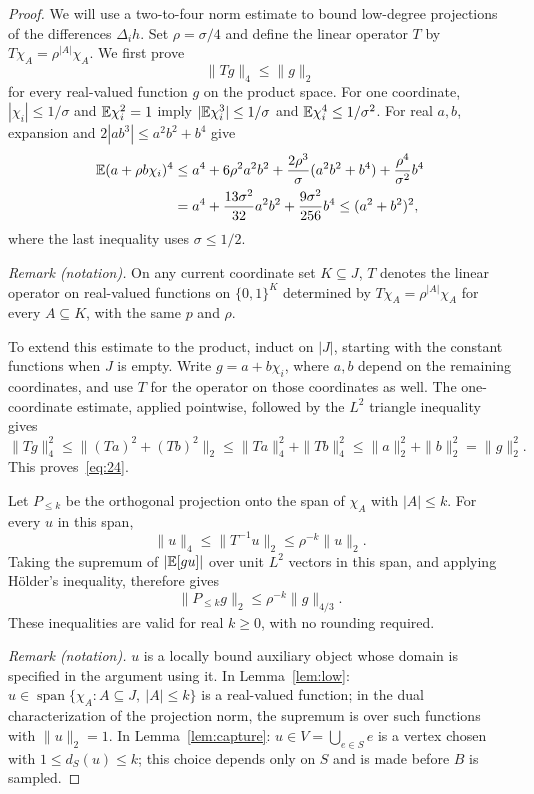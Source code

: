 \begin{proof}
We will use a two-to-four norm estimate to bound low-degree projections
of the differences $\Delta_i h$.
Set $\rho=\sigma/4$ and define the linear operator $T$ by
$T\chi_A=\rho^{|A|}\chi_A$. We first prove
\begin{equation}\label{eq:24}
 \|Tg\|_4\le\|g\|_2
\end{equation}
for every real-valued function $g$ on the product space.
For one coordinate, $|\chi_i|\le1/\sigma$ and $\mathbb E\chi_i^2=1$
imply $|\mathbb E\chi_i^3|\le1/\sigma$ and
$\mathbb E\chi_i^4\le1/\sigma^2$. For real $a,b$, expansion and
$2|ab^3|\le a^2b^2+b^4$ give
\begin{align*}
 \mathbb E(a+\rho b\chi_i)^4
 &\le a^4+6\rho^2a^2b^2+
       \frac{2\rho^3}{\sigma}(a^2b^2+b^4)
       +\frac{\rho^4}{\sigma^2}b^4\\
 &=a^4+\frac{13\sigma^2}{32}a^2b^2
       +\frac{9\sigma^2}{256}b^4
 \le(a^2+b^2)^2,
\end{align*}
where the last inequality uses $\sigma\le1/2$.

\noindent\textit{Remark (notation).} On any current coordinate set $K\subseteq J$, $T$ denotes the linear operator on real-valued functions on $\{0,1\}^K$ determined by $T\chi_A=\rho^{|A|}\chi_A$ for every $A\subseteq K$, with the same $p$ and $\rho$.


To extend this estimate to the product, induct on $|J|$, starting with
the constant functions when $J$ is empty. Write $g=a+b\chi_i$,
where $a,b$ depend on the remaining coordinates, and use $T$ for the
operator on those coordinates as well. The one-coordinate estimate,
applied pointwise, followed by the $L^2$ triangle inequality gives
\[
 \|Tg\|_4^2\le\|(Ta)^2+(Tb)^2\|_2
 \le\|Ta\|_4^2+\|Tb\|_4^2
 \le\|a\|_2^2+\|b\|_2^2=\|g\|_2^2.
\]
This proves~\eqref{eq:24}.

Let $P_{\le k}$ be the orthogonal projection onto the span of
$\chi_A$ with $|A|\le k$. For every $u$ in this span,
\[
 \|u\|_4\le\|T^{-1}u\|_2\le\rho^{-k}\|u\|_2.
\]
Taking the supremum of $|\mathbb E[gu]|$ over unit $L^2$ vectors in this
span, and applying H\"older's inequality, therefore gives
\begin{equation}\label{eq:projection}
 \|P_{\le k}g\|_2\le\rho^{-k}\|g\|_{4/3}.
\end{equation}
These inequalities are valid for real $k\ge0$, with no rounding
required.

\noindent\textit{Remark (notation).} $u$ is a locally bound auxiliary object whose domain is specified in the argument using it. In Lemma~\ref{lem:low}: $u\in\operatorname{span}\{\chi_A:A\subseteq J,\ |A|\le k\}$ is a real-valued function; in the dual characterization of the projection norm, the supremum is over such functions with $\|u\|_2=1$. In Lemma~\ref{lem:capture}: $u\in V=\bigcup_{e\in S}e$ is a vertex chosen with $1\le d_S(u)\le k$; this choice depends only on $S$ and is made before $B$ is sampled.



\end{proof}
